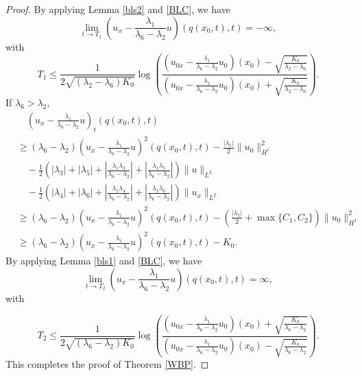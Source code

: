 \documentclass[11pt]{article}
\begin{document}
\begin{proof}
By applying Lemma \ref{bls2} and \eqref{BLC}, we have 
\begin{equation*}
\lim_{t\rightarrow T_1}\left(u_x -\frac{\lambda_1}{\lambda_6-\lambda_2}u\right)(q(x_0,t),t)=-\infty,
\end{equation*}
with 
\begin{equation*}
T_1\leq \frac{1}{2\sqrt{(\lambda_2-\lambda_6)K_0}}
\log\left( \frac{\left(u_{0x} -\frac{\lambda_1}{\lambda_6-\lambda_2}u_0\right)(x_0)
-\sqrt{\frac{K_0}{\lambda_2-\lambda_6}}}
{\left(u_{0x} -\frac{\lambda_1}{\lambda_6-\lambda_2}u_{0}\right)(x_0)
+\sqrt{\frac{K_0}{\lambda_2-\lambda_6}}}\right).
\end{equation*}
If $\lambda_6>\lambda_2$, 
\begin{equation*}
\begin{aligned}
&\quad\left(u_x -\frac{\lambda_1}{\lambda_6-\lambda_2}u\right)_t(q(x_0,t),t) \\
&\geq (\lambda_6-\lambda_2) \left(u_x -\frac{\lambda_1}{\lambda_6-\lambda_2}u\right)^2 (q(x_0,t),t)
-\frac{|\lambda_5|}{2}\|u_0\|_{H^1}^2\\
&\quad-\frac{1}{2}\left(|\lambda_3|+|\lambda_5|
+\left|\frac{\lambda_1\lambda_3}{\lambda_6-\lambda_2}\right|
+\left|\frac{\lambda_1\lambda_5}{\lambda_6-\lambda_2}\right|\right)\|u\|_{L^2}\\
&\quad-\frac{1}{2}\left(|\lambda_4|+|\lambda_6|
+\left|\frac{\lambda_1\lambda_4}{\lambda_6-\lambda_2}\right|
+\left|\frac{\lambda_1\lambda_6}{\lambda_6-\lambda_2}\right|\right)\|u_x\|_{L^2}\\
&\geq (\lambda_6-\lambda_2) \left(u_x -\frac{\lambda_1}{\lambda_6-\lambda_2}u\right)^2 (q(x_0,t),t)
-\left(\frac{|\lambda_5|}{2}+\max\{C_1,C_2\}\right)\|u_0\|_{H^1}^2\\
&\geq (\lambda_6-\lambda_2) \left(u_x -\frac{\lambda_1}{\lambda_6-\lambda_2}u\right)^2 (q(x_0,t),t)
-K_0.
\end{aligned}
\end{equation*}
By applying Lemma \ref{bls1} and \eqref{BLC}, we have 
\begin{equation*}
\lim_{t\rightarrow T_2}\left(u_x -\frac{\lambda_1}{\lambda_6-\lambda_2}u\right)(q(x_0,t),t)=\infty,
\end{equation*}
with 

\begin{equation*}
T_2\leq \frac{1}{2\sqrt{(\lambda_6-\lambda_2)K_0}}
\log\left( \frac{\left(u_{0x} -\frac{\lambda_1}{\lambda_6-\lambda_2}u_0\right)(x_0)
+\sqrt{\frac{K_0}{\lambda_6-\lambda_2}}}
{\left(u_{0x} -\frac{\lambda_1}{\lambda_6-\lambda_2}u_{0}\right)(x_0)
-\sqrt{\frac{K_0}{\lambda_6-\lambda_2}}}\right).
\end{equation*}
This completes the proof of Theorem \ref{WBP}.

\end{proof}
\end{document}
